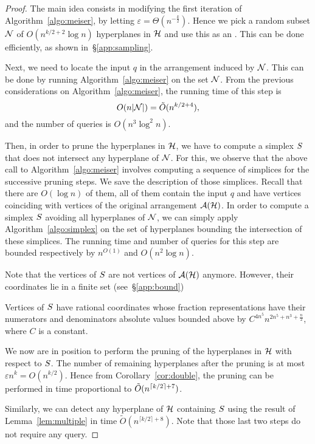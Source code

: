 \begin{proof}
The main idea consists in modifying the first iteration of Algorithm~\ref{algo:meiser}, by
letting $\varepsilon = \Theta(n^{-\frac{k}{2}})$.
Hence we pick a random subset $\mathcal{N}$ of
$O(n^{k/2 + 2} \log n)$ hyperplanes in $\mathcal{H}$ and use this as an \enet.
This can be done efficiently, as shown in~\S\ref{app:sampling}.

Next, we need to locate the input $q$ in the arrangement induced by
$\mathcal{N}$. This can be done by running Algorithm~\ref{algo:meiser} on the set
$\mathcal{N}$. From the previous considerations on Algorithm~\ref{algo:meiser}, the
running time of this step is
$$
O(n|\mathcal{N}|) = \tilde{O}(n^{k/2 + 4}),
$$
and the number of queries is $O(n^3\log^2 n)$.

Then, in order to prune the hyperplanes in $\mathcal{H}$, we have to
compute a simplex $S$ that does not intersect any hyperplane of
$\mathcal{N}$. For this, we observe that the above call to Algorithm~\ref{algo:meiser}
involves computing a sequence of simplices for the successive pruning
steps. We save the description of those simplices. Recall that there are
$O(\log n)$ of them, all of them contain the input $q$ and have vertices
coinciding with vertices of the original arrangement $\mathcal{A}(\mathcal{H})$. In
order to compute a simplex $S$ avoiding all hyperplanes of
$\mathcal{N}$, we can simply apply Algorithm~\ref{algo:simplex} on the set of
hyperplanes bounding the intersection of these simplices. The running time
and number of queries for this step are bounded respectively by
$n^{O(1)}$ and $O(n^2\log n)$.

Note that the vertices of $S$ are not vertices
of $\mathcal{A}(\mathcal{H})$ anymore. However, their coordinates lie in a finite set
(see~\S\ref{app:bound})
\begin{lemma}\label{lem:bound}
Vertices of $S$ have rational coordinates whose fraction representations
have their numerators and denominators absolute values bounded above by
$C^{4n^5} n^{2n^5+n^3+\frac n2}$, where $C$ is a constant.
\end{lemma}

We now are in position to perform the pruning of the hyperplanes in $\mathcal{H}$ with
respect to $S$. The number of remaining hyperplanes after the pruning is
at most $\varepsilon n^k = O(n^{k/2})$. Hence from Corollary~\ref{cor:double}, the
pruning can be performed in time proportional to $\tilde{O}(n^{\lceil k/2\rceil + 7})$.

Similarly, we can detect any hyperplane of $\mathcal{H}$ containing $S$ using the
result of Lemma~\ref{lem:multiple} in time $\tilde{O}(n^{\lceil k/2\rceil +
8})$. Note that those last two steps do not require any query.


\end{proof}
